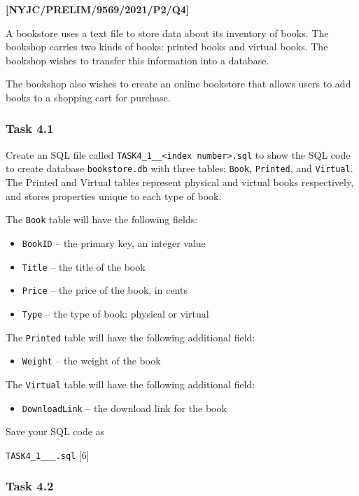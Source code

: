 \item \textbf{{[}NYJC/PRELIM/9569/2021/P2/Q4{]} }

A bookstore uses a text file to store data about its inventory of
books. The bookshop carries two kinds of books: printed books and
virtual books. The bookshop wishes to transfer this information into
a database. 

The bookshop also wishes to create an online bookstore that allows
users to add books to a shopping cart for purchase.

\subsubsection*{Task 4.1}

Create an SQL file called \texttt{TASK4\_1\_<centre number>\_<index
number>.sql} to show the SQL code to create database \texttt{bookstore.db}
with three tables: \texttt{Book}, \texttt{Printed}, and \texttt{Virtual}.
The Printed and Virtual tables represent physical and virtual books
respectively, and stores properties unique to each type of book. 

The \texttt{Book} table will have the following fields: 
\begin{itemize}
\item \texttt{BookID} -- the primary key, an integer value 
\item \texttt{Title} -- the title of the book 
\item \texttt{Price} -- the price of the book, in cents 
\item \texttt{Type} -- the type of book: \textquotedbl physical\textquotedbl{}
or \textquotedbl virtual\textquotedbl{} 
\end{itemize}
The \texttt{Printed} table will have the following additional field: 
\begin{itemize}
\item \texttt{Weight} -- the weight of the book 
\end{itemize}
The \texttt{Virtual} table will have the following additional field: 
\begin{itemize}
\item \texttt{DownloadLink} -- the download link for the book 
\end{itemize}
Save your SQL code as 

\texttt{TASK4\_1\_<your name>\_<centre number>\_<index number>.sql}
\hfill{}{[}6{]}

\subsubsection*{Task 4.2 }

